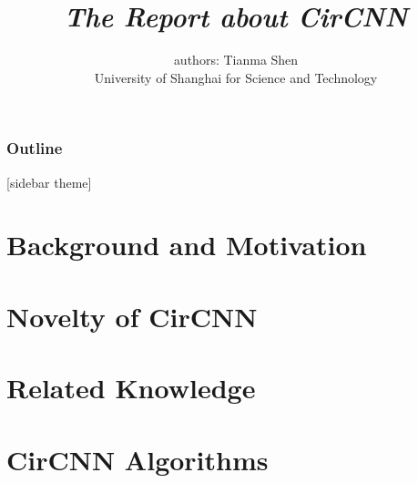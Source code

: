 \documentclass{beamer}
\begin{document}
    \title{\emph{The Report about CirCNN }}%
    \author[by Tianma Shen]{authors: Tianma Shen\\[5pt]\scriptsize{University of Shanghai for Science and Technology}}%

    \begin{frame}
        \titlepage
    \end{frame}


    \begin{frame}
        \frametitle{Outline}%
        \tableofcontents
    \end{frame}

    
    [sidebar theme]

    \section{Background and Motivation}


    
    

    \section{Novelty of CirCNN}

    

    \section{Related Knowledge}

    
    
    
    
    

    \section{CirCNN Algorithms}

    
    
    
\end{document}
